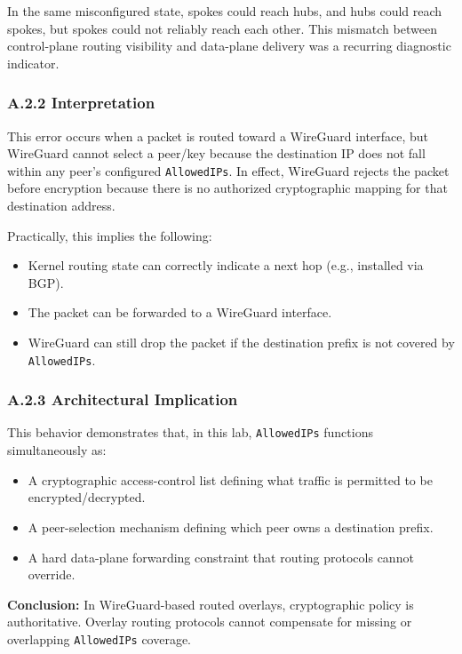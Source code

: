 \documentclass[11pt]{article}
\begin{document}
In the same misconfigured state, spokes could reach hubs, and hubs could reach spokes, but spokes could not reliably reach each other. This mismatch between control-plane routing visibility and data-plane delivery was a recurring diagnostic indicator.

\subsubsection{A.2.2 Interpretation}
\label{subsubsec:a2-interpretation}

This error occurs when a packet is routed toward a WireGuard interface, but WireGuard cannot select a peer/key because the destination IP does not fall within any peer’s configured \texttt{AllowedIPs}. In effect, WireGuard rejects the packet before encryption because there is no authorized cryptographic mapping for that destination address.

Practically, this implies the following:
\begin{itemize}
  \item Kernel routing state can correctly indicate a next hop (e.g., installed via BGP).
  \item The packet can be forwarded to a WireGuard interface.
  \item WireGuard can still drop the packet if the destination prefix is not covered by \texttt{AllowedIPs}.
\end{itemize}

\subsubsection{A.2.3 Architectural Implication}
\label{subsubsec:a2-architectural-implication}

This behavior demonstrates that, in this lab, \texttt{AllowedIPs} functions simultaneously as:
\begin{itemize}
  \item A cryptographic access-control list defining what traffic is permitted to be encrypted/decrypted.
  \item A peer-selection mechanism defining which peer owns a destination prefix.
  \item A hard data-plane forwarding constraint that routing protocols cannot override.
\end{itemize}

\textbf{Conclusion:} In WireGuard-based routed overlays, cryptographic policy is authoritative. Overlay routing protocols cannot compensate for missing or overlapping \texttt{AllowedIPs} coverage.
\end{document}

